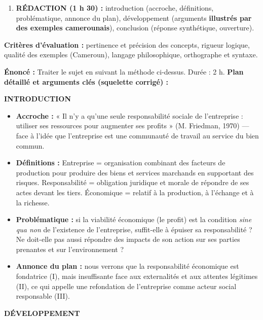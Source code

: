 \documentclass[11pt]{article}
\newcommand{\cle}[1]{{\popxbold\color{popdark}#1}}
\begin{document}
\begin{methode}
\begin{enumerate}
\begin{itemize}
              \end{itemize}
        \item \textbf{RÉDACTION (1 h 30) :} introduction (accroche, définitions, problématique, annonce du plan), développement (arguments \textbf{illustrés par des exemples camerounais}), conclusion (réponse synthétique, ouverture).
    \end{enumerate}
    \textbf{Critères d'évaluation :} pertinence et précision des concepts, rigueur logique, qualité des exemples (Cameroun), langage philosophique, orthographe et syntaxe.
\end{methode}

\begin{exoresolu}
    \textbf{Énoncé :} Traiter le sujet en suivant la méthode ci-dessus. Durée : 2 h.
    \tcblower
    \textbf{Plan détaillé et arguments clés (squelette corrigé) :}

    \textbf{INTRODUCTION}
    \begin{itemize}
        \item \textbf{Accroche :} « Il n'y a qu'une seule responsabilité sociale de l'entreprise : utiliser ses ressources pour augmenter ses profits » (M. Friedman, 1970) — face à l'idée que l'entreprise est une communauté de travail au service du bien commun.
        \item \textbf{Définitions :} Entreprise = organisation combinant des facteurs de production pour produire des biens et services marchands en supportant des risques. Responsabilité = obligation juridique et morale de répondre de ses actes devant les tiers. Économique = relatif à la production, à l'échange et à la richesse.
        \item \textbf{Problématique :} si la viabilité économique (le profit) est la condition \emph{sine qua non} de l'existence de l'entreprise, suffit-elle à épuiser sa responsabilité ? Ne doit-elle pas aussi répondre des impacts de son action sur ses \cle{parties prenantes} et sur l'environnement ?
        \item \textbf{Annonce du plan :} nous verrons que la responsabilité économique est fondatrice (I), mais insuffisante face aux externalités et aux attentes légitimes (II), ce qui appelle une refondation de l'entreprise comme acteur social responsable (III).
    \end{itemize}

    \textbf{DÉVELOPPEMENT}


\end{exoresolu}
\end{document}
